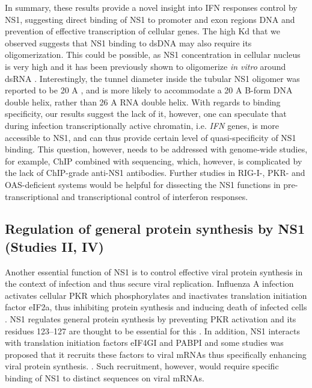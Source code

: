 		In summary, these results provide a novel insight into IFN responses control by NS1, suggesting direct binding of NS1 to promoter and exon regions DNA and prevention of effective transcription of cellular genes. The high \gls{Kd} that we observed suggests that NS1 binding to dsDNA may also require its oligomerization. This could be possible, as NS1 concentration in cellular nucleus is very high \parencite{Marazzi2012} and it has been previously shown to oligomerize \textit{in vitro} around dsRNA \parencite{Bornholdt2008}. Interestingly, the tunnel diameter inside the tubular NS1 oligomer was reported to be 20 \gls{A} \parencite{Bornholdt2008}, and is more likely to accommodate a 20 \gls{A} B-form DNA double helix, rather than 26 \gls{A} RNA double helix. With regards to binding specificity, our results suggest the lack of it, however, one can speculate that during infection transcriptionally active chromatin, i.e. \textit{IFN} genes, is more accessible to NS1, and can thus provide certain level of quasi-specificity of NS1 binding. This question, however, needs to be addressed with genome-wide studies, for example, \gls{ChIP} combined with sequencing, which, however, is complicated by the lack of \gls{ChIP}-grade anti-NS1 antibodies. Further studies in \gls{RIG-I}-, \gls{PKR}- and \gls{OAS}-deficient systems would be helpful for dissecting the NS1 functions in pre-transcriptional and transcriptional control of interferon responses. 								
						
	\subsection{Regulation of general protein synthesis by NS1 (Studies II, IV)}
	
		Another essential function of NS1 is to control effective viral protein synthesis in the context of infection and thus secure viral replication. Influenza A infection activates cellular \gls{PKR} which phosphorylates and inactivates translation initiation factor \gls{eIF2a}, thus inhibiting protein synthesis and inducing death of infected cells \parencite{Levin1978}. NS1 regulates general protein synthesis by preventing  \gls{PKR} activation and its residues 123--127 are thought to be essential for this \parencite{Lu1995, Min2007}. In addition, NS1 interacts with translation initiation factors \gls{eIF4GI} and \gls{PABP}I and some studies was proposed that it recruits these factors to viral mRNAs thus specifically enhancing viral protein synthesis. \parencite{DelaLuna1995, Aragon2000, Burgui2003}. Such recruitment, however, would require specific binding of NS1 to distinct sequences on viral mRNAs.
		
